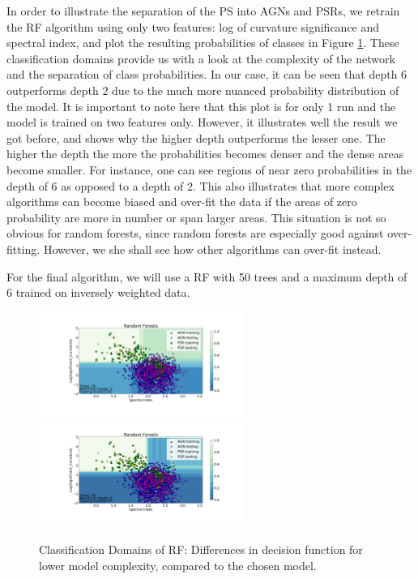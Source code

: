 In order to illustrate the separation of the PS into AGNs and PSRs, we retrain the RF algorithm using only two features: log of curvature significance and spectral index, and plot the resulting probabilities of classes in Figure \ref{fig:RF_domains}. These classification domains provide us with a look at the complexity of the network and the separation of class probabilities.
In our case, it can be seen that depth 6 outperforms depth 2 due to the much more nuanced probability distribution of the model. It is important to note here that this plot is for only 1 run and the model is trained on two features only. However, it illustrates well the result we got before, and shows why the higher depth outperforms the lesser one. The higher the depth the more the probabilities becomes denser and the dense areas become smaller. For instance, one can see regions of near zero probabilities in the depth of 6 as opposed to a depth of 2. This also illustrates that more complex algorithms can become biased and over-fit the data if the areas of zero probability are more in number or span larger areas. This situation is not so obvious for random forests, since random forests are especially good against over-fitting. However, we she shall see how other algorithms can over-fit instead.

For the final algorithm, we will use a RF with 50 trees and a maximum depth of 6 trained on inversely weighted data.

\begin{figure}[h]
\hspace*{-1.5cm}
\includegraphics[width=0.6\textwidth]{plots/classification_domains/rf_20_2_final.pdf}
\hspace*{-1.5cm}
\includegraphics[width=0.6\textwidth]{plots/classification_domains/rf_50_6_final.pdf}
\caption{Classification Domains of RF: Differences in decision function for lower model complexity, compared to the chosen model.}  
\label{fig:RF_domains}
\end{figure}

